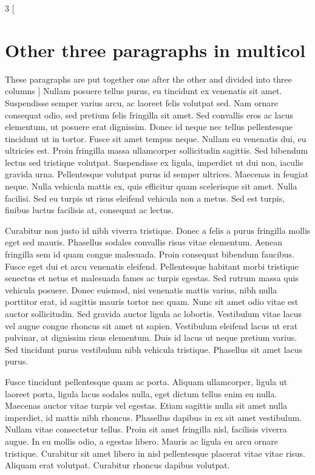 \documentclass[12pt]{article}
\begin{document}
\newpage


\setlength{\columnsep}{1cm}

\begin{multicols}{3}
[
\section{Other three paragraphs in multicol}
These paragraphs are put together one after the other and divided into three columns
]
Nullam posuere tellus purus, eu tincidunt ex venenatis sit amet. Suspendisse semper varius arcu, ac laoreet felis volutpat sed. Nam ornare consequat odio, sed pretium felis fringilla sit amet. Sed convallis eros ac lacus elementum, ut posuere erat dignissim. Donec id neque nec tellus pellentesque tincidunt ut in tortor. Fusce sit amet tempus neque. Nullam eu venenatis dui, eu ultricies est. Proin fringilla massa ullamcorper sollicitudin sagittis. Sed bibendum lectus sed tristique volutpat. Suspendisse ex ligula, imperdiet ut dui non, iaculis gravida urna. Pellentesque volutpat purus id semper ultrices. Maecenas in feugiat neque. Nulla vehicula mattis ex, quis efficitur quam scelerisque sit amet. Nulla facilisi. Sed eu turpis ut risus eleifend vehicula non a metus. Sed est turpis, finibus luctus facilisis at, consequat ac lectus.

Curabitur non justo id nibh viverra tristique. Donec a felis a purus fringilla mollis eget sed mauris. Phasellus sodales convallis risus vitae elementum. Aenean fringilla sem id quam congue malesuada. Proin consequat bibendum faucibus. Fusce eget dui et arcu venenatis eleifend. Pellentesque habitant morbi tristique senectus et netus et malesuada fames ac turpis egestas. Sed rutrum massa quis vehicula posuere. Donec euismod, nisi venenatis mattis varius, nibh nulla porttitor erat, id sagittis mauris tortor nec quam. Nunc sit amet odio vitae est auctor sollicitudin. Sed gravida auctor ligula ac lobortis. Vestibulum vitae lacus vel augue congue rhoncus sit amet ut sapien. Vestibulum eleifend lacus ut erat pulvinar, at dignissim risus elementum. Duis id lacus ut neque pretium varius. Sed tincidunt purus vestibulum nibh vehicula tristique. Phasellus sit amet lacus purus.

Fusce tincidunt pellentesque quam ac porta. Aliquam ullamcorper, ligula ut laoreet porta, ligula lacus sodales nulla, eget dictum tellus enim eu nulla. Maecenas auctor vitae turpis vel egestas. Etiam sagittis nulla sit amet nulla imperdiet, id mattis nibh rhoncus. Phasellus dapibus in ex sit amet vestibulum. Nullam vitae consectetur tellus. Proin sit amet fringilla nisl, facilisis viverra augue. In eu mollis odio, a egestas libero. Mauris ac ligula eu arcu ornare tristique. Curabitur sit amet libero in nisl pellentesque placerat vitae vitae risus. Aliquam erat volutpat. Curabitur rhoncus dapibus volutpat.

\end{multicols}
\end{document}
